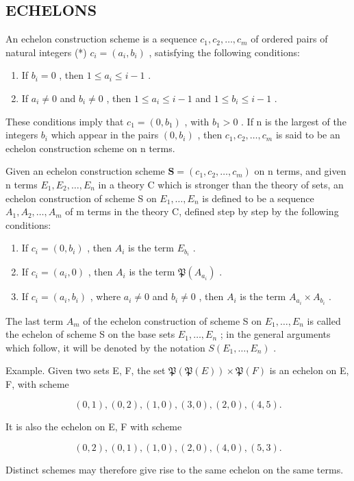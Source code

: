 \subsection{ECHELONS}

An echelon construction scheme is a sequence \(c_1, c_2, \ldots, c_m\) of ordered pairs of natural integers (*) \(c_i = (a_i, b_i)\) , satisfying the following conditions:

\begin{enumerate}
\def\labelenumi{(\alph{enumi})}
\item
  If \(b_{i} = 0\) , then \(1 \leqslant a_{i} \leqslant i - 1\) .
\item
  If \(a_i \neq 0\) and \(b_i \neq 0\) , then \(1 \leqslant a_i \leqslant i - 1\) and \(1 \leqslant b_i \leqslant i - 1\) .
\end{enumerate}

These conditions imply that \(c_{1}=(0,b_{1})\) , with \(b_{1}>0\) . If n is the largest of the integers \(b_{i}\) which appear in the pairs \((0,b_{i})\) , then \(c_{1},c_{2},\ldots,c_{m}\) is said to be an echelon construction scheme on n terms.

Given an echelon construction scheme \(\mathbf{S} = (c_{1}, c_{2}, \ldots, c_{m})\) on n terms, and given n terms \(E_{1}, E_{2}, \ldots, E_{n}\) in a theory C which is stronger than the theory of sets, an echelon construction of scheme S on \(E_{1}, \ldots, E_{n}\) is defined to be a sequence \(A_{1}, A_{2}, \ldots, A_{m}\) of m terms in the theory C, defined step by step by the following conditions:

\begin{enumerate}
\def\labelenumi{(\alph{enumi})}
\item
  If \(c_{i} = (0, b_{i})\) , then \(A_{i}\) is the term \(E_{b_{i}}\) .
\item
  If \(c_{i} = (a_{i}, 0)\) , then \(A_{i}\) is the term \(\mathfrak{P}(A_{a_i})\) .
\item
  If \(c_{i} = (a_{i}, b_{i})\) , where \(a_{i} \neq 0\) and \(b_{i} \neq 0\) , then \(A_{i}\) is the term \(A_{a_{i}} \times A_{b_{i}}\) .
\end{enumerate}

The last term \(A_{m}\) of the echelon construction of scheme S on \(E_{1}, \ldots, E_{n}\) is called the echelon of scheme S on the base sets \(E_{1}, \ldots, E_{n}\) ; in the general arguments which follow, it will be denoted by the notation \(S(E_{1}, \ldots, E_{n})\) .

Example. Given two sets E, F, the set \(\mathfrak{P}(\mathfrak{P}(E)) \times \mathfrak{P}(F)\) is an echelon on E, F, with scheme

\[
(0, 1), (0, 2), (1, 0), (3, 0), (2, 0), (4, 5).
\]

It is also the echelon on E, F with scheme

\[
(0, 2), (0, 1), (1, 0), (2, 0), (4, 0), (5, 3).
\]

Distinct schemes may therefore give rise to the same echelon on the same terms.

